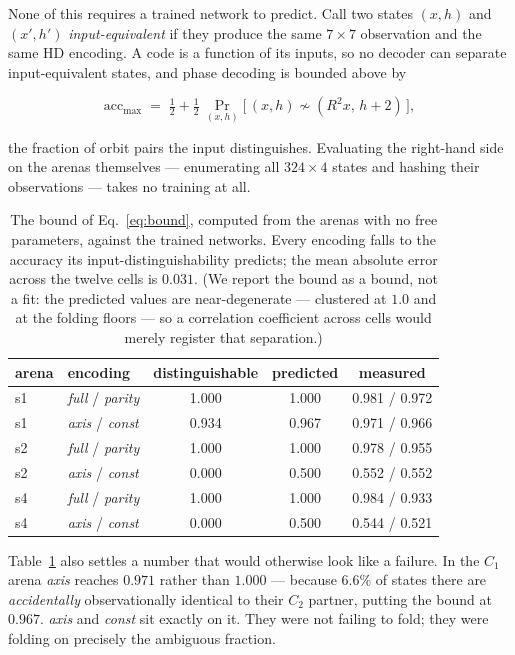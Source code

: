 \documentclass[9pt,lineno]{elife}
\begin{document}
None of this requires a trained network to predict. Call two states $(x,h)$ and $(x',h')$
\emph{input-equivalent} if they produce the same $7\times7$ observation and the same HD encoding.
A code is a function of its inputs, so no decoder can separate input-equivalent states, and phase
decoding is bounded above by

\begin{equation}
\mathrm{acc}_{\max} \;=\; \tfrac12 + \tfrac12 \, \Pr_{(x,h)}\!\big[\,(x,h) \not\sim (R^2x,\, h+2)\,\big],
\label{eq:bound}
\end{equation}

the fraction of orbit pairs the input distinguishes. Evaluating the right-hand side on the arenas
themselves --- enumerating all $324\times4$ states and hashing their observations --- takes no
training at all.

\begin{table}[t]
\centering
\caption{The bound of Eq.~\ref{eq:bound}, computed from the arenas with no free parameters,
against the trained networks. Every encoding falls to the accuracy its input-distinguishability
predicts; the mean absolute error across the twelve cells is $0.031$. (We report the bound as a
bound, not a fit: the predicted values are near-degenerate --- clustered at $1.0$ and at the
folding floors --- so a correlation coefficient across cells would merely register that
separation.)}
\label{tab:bound}
\begin{tabular}{llccc}
\toprule
arena & encoding & distinguishable & predicted & measured \\
\midrule
s1 & \textit{full} / \textit{parity} & 1.000 & 1.000 & 0.981 / 0.972 \\
s1 & \textit{axis} / \textit{const}  & 0.934 & 0.967 & 0.971 / 0.966 \\
s2 & \textit{full} / \textit{parity} & 1.000 & 1.000 & 0.978 / 0.955 \\
s2 & \textit{axis} / \textit{const}  & 0.000 & 0.500 & 0.552 / 0.552 \\
s4 & \textit{full} / \textit{parity} & 1.000 & 1.000 & 0.984 / 0.933 \\
s4 & \textit{axis} / \textit{const}  & 0.000 & 0.500 & 0.544 / 0.521 \\
\bottomrule
\end{tabular}
\end{table}

Table~\ref{tab:bound} also settles a number that would otherwise look like a failure. In the
$C_1$ arena \textit{axis} reaches $0.971$ rather than $1.000$ --- because $6.6\%$ of states there
are \emph{accidentally} observationally identical to their $C_2$ partner, putting the bound at
$0.967$. \textit{axis} and \textit{const} sit exactly on it. They were not failing to fold; they
were folding on precisely the ambiguous fraction.
\end{document}
